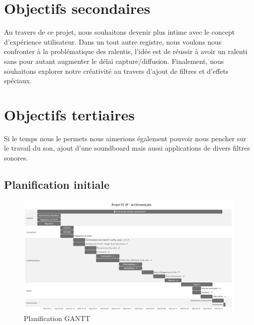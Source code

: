 \section{Objectifs secondaires}

Au travers de ce projet, nous souhaitons devenir plus intime avec le concept d'expérience utilisateur.
Dans un tout autre registre, nous voulons nous confronter à la problématique des ralentis, l'idée est de réussir à avoir un ralenti sans pour autant augmenter le délai capture/diffusion.
Finalement, nous souhaitons explorer notre créativité au travers d'ajout de filtres et d'effets spéciaux.

\section{Objectifs tertiaires}

Si le temps nous le permets nous aimerions également pouvoir nous pencher sur le travail du son, ajout d'une soundboard mais aussi applications de divers filtres sonores.

\newpage

\begin{landscape}

\section{Planification initiale}

\begin{figure}[h]
  \centering
  \includegraphics[width=\textwidth]{./images/gantt.PNG}
  \caption{Planification GANTT}
  \label{gantt}
\end{figure}

\end{landscape}

\newpage

